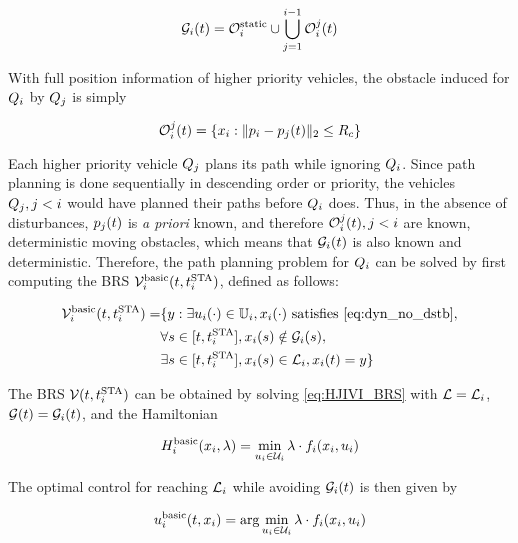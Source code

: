 \begin{equation}
\label{eq:obsseti}
\obsset_i(t)  = \soset_i \cup \bigcup_{j=1}^{i-1} \ioset_i^j(t)
\end{equation}

With full position information of higher priority vehicles, the obstacle induced for $Q_i$ by $Q_j$ is simply

\begin{equation}
\label{eq:ioset}
\ioset_i^j(t) = \{\state_i: \|\pos_i - \pos_j(t)\|_2 \le \rc \}
\end{equation}

Each higher priority vehicle $Q_j$ plans its path while ignoring $Q_i$. Since path planning is done sequentially in descending order or priority, the vehicles $Q_j, j<i$ would have planned their paths before $Q_i$ does. Thus, in the absence of disturbances, $p_j(t)$ is \textit{a priori} known, and therefore $\mathcal{O}_i^j(t), j<i$ are known, deterministic moving obstacles, which means that $\mathcal{G}_i(t)$ is also known and deterministic. Therefore, the path planning problem for $Q_i$ can be solved by first computing the BRS $\mathcal{V}_i^\text{basic}(t, t^\text{STA}_i)$, defined as follows:

\begin{equation}
\label{eq:BRS_basic}
\begin{aligned}
\brs_i^\text{basic}(t, \sta_i) = & \{y: \exists \ctrl_i(\cdot) \in \cfset_i, \state_i(\cdot) \text{ satisfies \eqref{eq:dyn_no_dstb}}, \\
& \forall s \in [t, \sta_i],\state_i(s) \notin \obsset_i(s), \\
& \exists s \in [t, \sta_i], \state_i(s) \in \targetset_i, \state_i(t) = y\}
\end{aligned}
\end{equation}

The BRS $\mathcal{V}(t, t^\text{STA}_i)$ can be obtained by solving \eqref{eq:HJIVI_BRS} with $\mathcal{L} = \mathcal{L}_i$, $\mathcal{G}(t) = \mathcal{G}_i(t)$, and the Hamiltonian 

\begin{equation}
\label{eq:basicham}
\ham_i^\text{basic}(\state_i, \costate) = \min_{\ctrl_i\in\cset_i} \costate \cdot \fdyn_i(\state_i, \ctrl_i)
\end{equation}

The optimal control for reaching $\mathcal{L}_i$ while avoiding $\mathcal{G}_i(t)$ is then given by

\begin{equation}
\label{eq:basicOptCtrl}
\ctrl_i^\text{basic}(t, \state_i) = \arg \min_{\ctrl_i\in\cset_i} \costate \cdot \fdyn_i(\state_i, \ctrl_i)
\end{equation}

